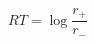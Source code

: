 \begin{equation}\label{eqn:reaction-affinity-
\frac{\mathcal A}{RT}= \log\frac{r_+}{r_-} 
\end{equation}